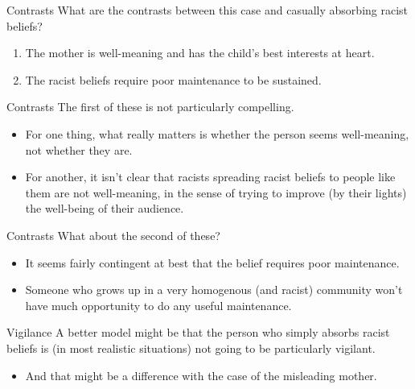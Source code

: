 \documentclass[
  17pt,
  letterpaper,
  ignorenonframetext,
  aspectratio=169,
  xcolor={dvipsnames}]{beamer}
\providecommand{\tightlist}{%
  \setlength{\itemsep}{0pt}\setlength{\parskip}{0pt}}\usepackage{longtable,booktabs,array}
\begin{document}
\begin{frame}{Contrasts}
\protect\hypertarget{contrasts}{}
What are the contrasts between this case and casually absorbing racist
beliefs?

\begin{enumerate}[<+->]
\tightlist
\item
  The mother is well-meaning and has the child's best interests at
  heart.
\item
  The racist beliefs require poor maintenance to be sustained.
\end{enumerate}
\end{frame}

\begin{frame}{Contrasts}
\protect\hypertarget{contrasts-1}{}
The first of these is not particularly compelling.

\begin{itemize}[<+->]
\tightlist
\item
  For one thing, what really matters is whether the person seems
  well-meaning, not whether they are.
\item
  For another, it isn't clear that racists spreading racist beliefs to
  people like them are not well-meaning, in the sense of trying to
  improve (by their lights) the well-being of their audience.
\end{itemize}
\end{frame}

\begin{frame}{Contrasts}
\protect\hypertarget{contrasts-2}{}
What about the second of these?

\begin{itemize}[<+->]
\tightlist
\item
  It seems fairly contingent at best that the belief requires poor
  maintenance.
\item
  Someone who grows up in a very homogenous (and racist) community won't
  have much opportunity to do any useful maintenance.
\end{itemize}
\end{frame}

\begin{frame}{Vigilance}
\protect\hypertarget{vigilance}{}
A better model might be that the person who simply absorbs racist
beliefs is (in most realistic situations) not going to be particularly
vigilant.

\begin{itemize}[<+->]
\tightlist
\item
  And that might be a difference with the case of the misleading mother.
\end{itemize}
\end{frame}
\end{document}
